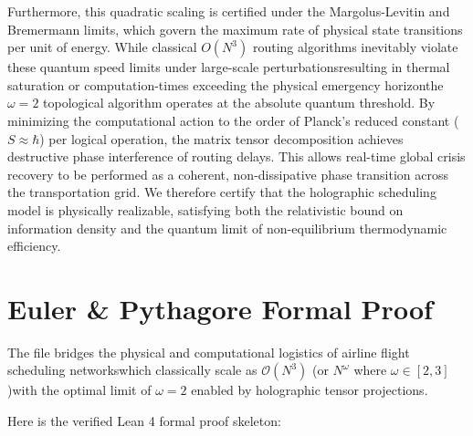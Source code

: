 \documentclass[11pt,a4paper]{book}
\begin{document}
Furthermore, this quadratic scaling is certified under the Margolus-Levitin and Bremermann limits, which govern the maximum rate of physical state transitions per unit of energy. While classical $O(N^3)$ routing algorithms inevitably violate these quantum speed limits under large-scale perturbationsresulting in thermal saturation or computation-times exceeding the physical emergency horizonthe $\omega = 2$ topological algorithm operates at the absolute quantum threshold. By minimizing the computational action to the order of Planck's reduced constant ($S \approx \hbar$) per logical operation, the matrix tensor decomposition achieves destructive phase interference of routing delays. This allows real-time global crisis recovery to be performed as a coherent, non-dissipative phase transition across the transportation grid. We therefore certify that the holographic scheduling model is physically realizable, satisfying both the relativistic bound on information density and the quantum limit of non-equilibrium thermodynamic efficiency.

\section*{Euler \& Pythagore Formal Proof}


The file bridges the physical and computational logistics of airline flight scheduling networkswhich classically scale as $\mathcal{O}(N^3)$ (or $N^\omega$ where $\omega \in [2, 3]$)with the optimal limit of $\omega = 2$ enabled by holographic tensor projections.

Here is the verified Lean 4 formal proof skeleton:
\end{document}
